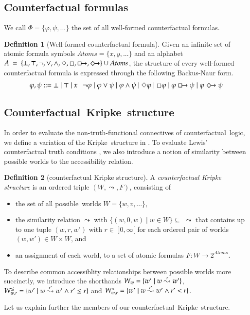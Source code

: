 \documentclass[a4paper,american,10pt]{paper}
\theoremstyle{definition}\newtheorem{lemma}[thm]{Lemma}
\theoremstyle{definition}\newtheorem{proposition}[thm]{Proposition}
\theoremstyle{definition}\newtheorem{corollary}[thm]{Corollary}
\theoremstyle{definition}\newtheorem{definition}{Definition}
\begin{document}
\subsection{Counterfactual formulas}
We call $\Phi = \{\varphi ,\psi ,...\}$ the set of all well-formed counterfactual formulas.
\begin{definition}[Well-formed counterfactual formula]
Given an infinite set of atomic formula symbols $Atoms = \{ x, y, ...\}$ and an alphabet $A~=~\{\bot ,\top ,\neg ,\vee ,\wedge ,\Diamond ,\Box ,\boxright ,\Diamondright\}\cup Atoms$, the structure of every well-formed counterfactual formula is expressed through the following Backus-Naur form.
\begin{equation}
\varphi, \psi ::= \bot \mid \top \mid x \mid \neg \varphi \mid \varphi \vee \psi \mid \varphi \wedge \psi \mid \Diamond \varphi \mid \Box \varphi \mid \varphi \boxright \psi \mid \varphi \Diamondright \psi
\end{equation}
\end{definition}
\newpage
\subsection{Counterfactual~Kripke~structure}
In order to evaluate the non-truth-functional connectives of counterfactual~logic, we define a variation of the Kripke~structure in \cite{kripke_modal_logic_1963}. To evaluate Lewis' counterfactual truth conditions \cite{lewis_counterfactuals_1973}, we also introduce a notion of similarity between possible worlds to the accessibility relation.
\begin{definition}[counterfactual Kripke structure]
A {\it counterfactual Kripke structure} is an ordered triple $(W, \leadsto ,F)$, consisting of
\begin{itemize}
\item the set of all possible~worlds $W=\{w,v,...\}$,
\item the similarity relation $\leadsto$ with $\{(w,0,w)\mid w\in W\}\subseteq$ $\leadsto$ that contains up to one tuple $(w, r, w')$ with $r\in$ $]0,\infty [$ for each ordered pair of worlds $(w,w')\in W\times W$, and
\item an assignment of each world, to a set of atomic formulas $F \colon W \rightarrow 2^{Atoms}$.
\end{itemize}
To describe common accessiblity relationships between possible worlds more succinctly, we introduce the shorthands $W_w = \{w'\mid \smash{w \overset{r}{\leadsto} w'}\}$, $W_{w,r}^\leq = \{w'\mid \smash{w \overset{r'}{\leadsto} w'}\wedge r'\leq r\}$ and $W_{w,r}^< = \{w'\mid \smash{w \overset{r'}{\leadsto} w'}\wedge r'< r\}$.
\end{definition}
\noindent Let us explain further the members of our counterfactual~Kripke~structure.
\end{document}
